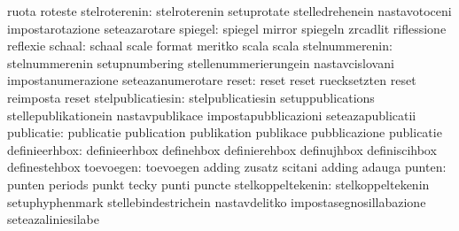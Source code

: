                                   ruota                            roteste %
                   stelroterenin: stelroterenin                    setuprotate
                                  stelledrehenein                  nastavotoceni
                                  impostarotazione                 seteazarotare
                         spiegel: spiegel                          mirror
                                  spiegeln                         zrcadlit
                                  riflessione                      reflexie
                          schaal: schaal                           scale
                                  format                           meritko
                                  scala                            scala %
                  stelnummerenin: stelnummerenin                   setupnumbering
                                  stellenummerierungein            nastavcislovani
                                  impostanumerazione               seteazanumerotare
                           reset: reset                            reset
                                  ruecksetzten                     reset
                                  reimposta                        reset
               stelpublicatiesin: stelpublicatiesin                setuppublications
                                  stellepublikationein             nastavpublikace
                                  impostapubblicazioni             seteazapublicatii
                      publicatie: publicatie                       publication
                                  publikation                      publikace
                                  pubblicazione                    publicatie
                   definieerhbox: definieerhbox                    definehbox
                                  definierehbox                    definujhbox
                                  definiscihbox                    definestehbox
                       toevoegen: toevoegen                        adding
                                  zusatz                           scitani
                                  adding                           adauga %
                          punten: punten                           periods
                                  punkt                            tecky
                                  punti                            puncte
               stelkoppeltekenin: stelkoppeltekenin                setuphyphenmark
                                  stellebindestrichein             nastavdelitko
                                  impostasegnosillabazione         seteazaliniesilabe %
